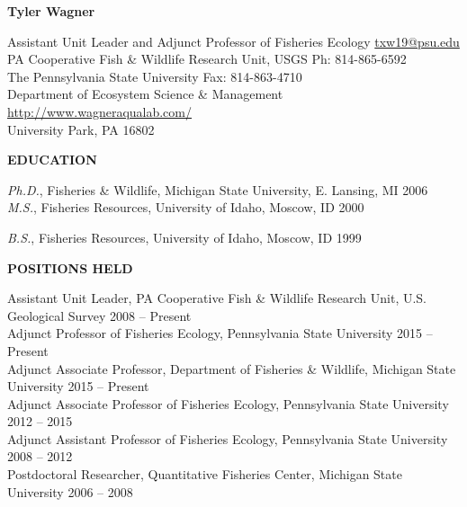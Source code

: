 \documentclass[10pt]{article}
\begin{document}
\centerline {\bf{\Large Tyler Wagner}}
\vspace{8pt}
\begin{flushleft}
Assistant Unit Leader and Adjunct Professor of Fisheries Ecology \hfill \href{mailto:txw19@psu.edu}{txw19@psu.edu}\\
PA Cooperative Fish \& Wildlife Research Unit, USGS \hfill Ph: 814-865-6592\\
 The Pennsylvania State University  \hfill Fax: 814-863-4710\\
 Department of Ecosystem Science \& Management \hfill  \url{http://www.wagneraqualab.com/}\\
University Park, PA 16802\\


\vspace{8pt}

\centerline {\bf{EDUCATION}}

\vspace{5pt}
{\sl Ph.D.}, 
Fisheries \& Wildlife, 
Michigan State University, E. Lansing, MI \hfill 2006 \\ 
\vspace{5pt}
{\sl M.S.}, Fisheries Resources,
University of Idaho, Moscow, ID \hfill 2000

\vspace{5pt}

{\sl B.S.}, Fisheries Resources,
University of Idaho, Moscow, ID \hfill 1999

\vspace{8pt}
\centerline {\bf{POSITIONS HELD}}
\vspace{5pt}
Assistant Unit Leader, PA Cooperative Fish \& Wildlife Research Unit, U.S. Geological Survey \hfill 2008 -- Present \\
Adjunct Professor of Fisheries Ecology, Pennsylvania State University  \hfill 2015 -- Present \\
Adjunct Associate Professor, Department of Fisheries \& Wildlife, Michigan State University \hfill 2015 -- Present \\
Adjunct Associate Professor of Fisheries Ecology, Pennsylvania State University  \hfill 2012 -- 2015 \\
Adjunct Assistant Professor of Fisheries Ecology, Pennsylvania State University  \hfill 2008 -- 2012 \\
Postdoctoral Researcher, Quantitative Fisheries Center, Michigan State University \hfill 2006 -- 2008 \\


\end{flushleft}
\end{document}
